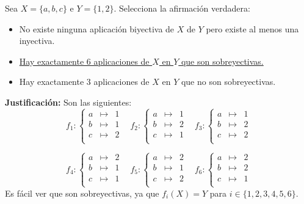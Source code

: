 \documentclass[12pt]{article}
\begin{document}
    \begin{ejercicio}
        Sea $X = \{a, b, c\}$ e $Y = \{1, 2\}$. Selecciona la afirmación verdadera:
        \begin{itemize}
            \item No existe ninguna aplicación biyectiva de $X$ de $Y$ pero existe al menos una inyectiva.
            \item \underline{Hay exactamente 6 aplicaciones de $X$ en $Y$ que son sobreyectivas.}
            \item Hay exactamente 3 aplicaciones de $X$ en $Y$ que no son sobreyectivas.
        \end{itemize}
        \textbf{Justificación:}\newline
        Son las siguientes:
        $$f_1:\left\{\begin{array}{ccc}
            a & \mapsto & 1 \\
            b & \mapsto & 1 \\
            c & \mapsto & 2 \\
        \end{array}\right.~~~~
        f_2:\left\{\begin{array}{ccc}
            a & \mapsto & 1 \\
            b & \mapsto & 2 \\
            c & \mapsto & 1 \\
        \end{array}\right.~~~~
        f_3:\left\{\begin{array}{ccc}
            a & \mapsto & 1 \\
            b & \mapsto & 2 \\
            c & \mapsto & 2 \\
        \end{array}\right.$$
        
        $$f_4:\left\{\begin{array}{ccc}
            a & \mapsto & 2 \\
            b & \mapsto & 1 \\
            c & \mapsto & 1 \\
        \end{array}\right.~~~~
        f_5:\left\{\begin{array}{ccc}
            a & \mapsto & 2 \\
            b & \mapsto & 1 \\
            c & \mapsto & 2 \\
        \end{array}\right.~~~~
        f_6:\left\{\begin{array}{ccc}
            a & \mapsto & 2 \\
            b & \mapsto & 2 \\
            c & \mapsto & 1 \\
        \end{array}\right.$$
        Es fácil ver que son sobreyectivas, ya que $f_i(X) = Y$ para $i \in \{1, 2, 3, 4, 5, 6\}$.
        
    \end{ejercicio}
\end{document}
